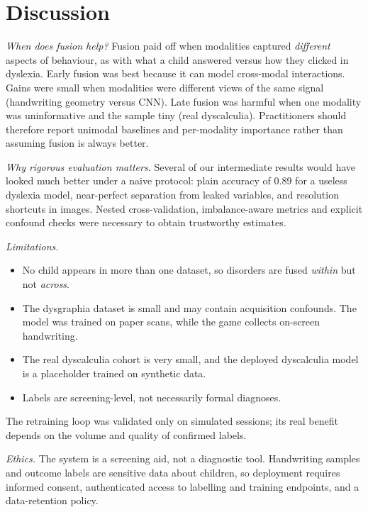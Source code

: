 \documentclass[conference]{IEEEtran}
\begin{document}
\section{Discussion}
\textit{When does fusion help?} Fusion paid off when modalities captured \emph{different} aspects of behaviour, as
with what a child answered versus how they clicked in dyslexia. Early fusion was best because it can model
cross-modal interactions. Gains were small when modalities were different views of the same signal (handwriting
geometry versus CNN). Late fusion was harmful when one modality was uninformative and the sample tiny (real
dyscalculia). Practitioners should therefore report unimodal baselines and per-modality importance rather than
assuming fusion is always better.

\textit{Why rigorous evaluation matters.} Several of our intermediate results would have looked much better under a
naive protocol: plain accuracy of 0.89 for a useless dyslexia model, near-perfect separation from leaked variables,
and resolution shortcuts in images. Nested cross-validation, imbalance-aware metrics and explicit confound checks
were necessary to obtain trustworthy estimates.

\textit{Limitations.}
\begin{itemize}
  \item No child appears in more than one dataset, so disorders are fused \emph{within} but not \emph{across}.
  \item The dysgraphia dataset is small and may contain acquisition confounds. The model was trained on paper
        scans, while the game collects on-screen handwriting.
  \item The real dyscalculia cohort is very small, and the deployed dyscalculia model is a placeholder trained on
        synthetic data.
  \item Labels are screening-level, not necessarily formal diagnoses.
\end{itemize}
The retraining loop was validated only on simulated sessions; its real benefit depends on the volume and quality of
confirmed labels.

\textit{Ethics.} The system is a screening aid, not a diagnostic tool. Handwriting samples and outcome labels are
sensitive data about children, so deployment requires informed consent, authenticated access to labelling and
training endpoints, and a data-retention policy.

\end{document}
